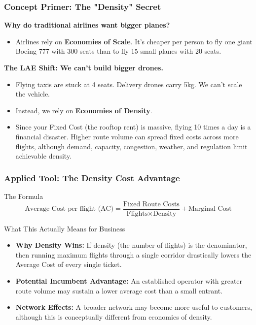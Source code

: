 \documentclass{beamer}
\begin{document}
\begin{frame}[t]
  \frametitle{Concept Primer: The "Density" Secret}
 
  \textbf{Why do traditional airlines want bigger planes?}
  \begin{itemize}
      \item Airlines rely on \textbf{Economies of Scale}. It's cheaper per person to fly one giant Boeing 777 with 300 seats than to fly 15 small planes with 20 seats.
  \end{itemize}
  \vspace{0.3cm}
  \textbf{The LAE Shift: We can't build bigger drones.}
  \begin{itemize}
      \item Flying taxis are stuck at 4 seats. Delivery drones carry 5kg. We can't scale the vehicle.
      \item Instead, we rely on \textbf{Economies of Density}.
      \item Since your Fixed Cost (the rooftop rent) is massive, flying 10 times a day is a financial disaster. Higher route volume can spread fixed costs across more flights, although demand, capacity, congestion, weather, and regulation limit achievable density.
  \end{itemize}
\end{frame}

\begin{frame}[t, shrink=10]
  \frametitle{Applied Tool: The Density Cost Advantage}
 
  \begin{block}{The Formula}
  \begin{equation}
      \text{Average Cost per flight (AC)} = \frac{\text{Fixed Route Costs}}{\text{Flights} \times \text{Density}} + \text{Marginal Cost}
  \end{equation}
  \end{block}
  \vspace{0.1cm}
  \begin{block}{What This Actually Means for Business}
  \begin{itemize}
    \item \textbf{Why Density Wins:} If density (the number of flights) is the denominator, then running maximum flights through a single corridor drastically lowers the Average Cost of every single ticket.
    \item \textbf{Potential Incumbent Advantage:} An established operator with greater route volume may sustain a lower average cost than a small entrant.
    \item \textbf{Network Effects:} A broader network may become more useful to customers, although this is conceptually different from economies of density.
  \end{itemize}
  \end{block}
\end{frame}
\end{document}
